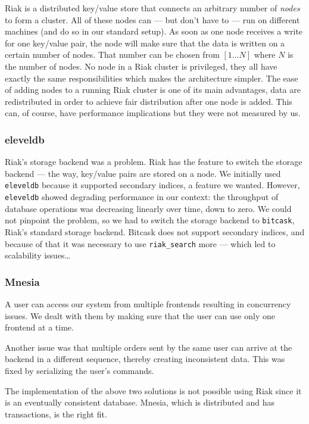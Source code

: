 \documentclass[11pt,a4paper]{report}
\begin{document}
Riak is a distributed key/value store that connects an arbitrary number of
{\em nodes} to form a cluster. All of these nodes can --- but don't have to ---
run on different machines (and do so in our standard setup). As soon as one
node receives a write for one key/value pair, the node will make sure that the
data is written on a certain number of nodes. That number can be chosen from
$[1 \ldots N]$ where $N$ is the number of nodes.
No node in a Riak cluster is privileged, they all have exactly the same
responsibilities which makes the architecture simpler.
The ease of adding nodes to a running Riak cluster is one of its main
advantages, data are redistributed in order to achieve fair distribution after
one node is added. This can, of course, have performance implications but they
were not measured by us.

\subsubsection{eleveldb}
Riak's storage backend was a problem. Riak has the feature to switch the
storage backend --- the way, key/value pairs are stored on a node.
We initially used {\tt eleveldb} because it supported secondary indices, a
feature we wanted. However, {\tt eleveldb} showed degrading performance
in our context: the throughput of database operations was decreasing linearly
over time, down to zero. We could not pinpoint the problem, so we had to switch
the storage backend to {\tt bitcask}, Riak's standard storage backend.
Bitcask does not support secondary indices, and because of that it was
necessary to use {\tt riak\_search} more --- which led to scalability
issues\ldots

\subsubsection{Mnesia}
\label{sec:mnesia}
A user can access our system from multiple frontends resulting in
concurrency issues. We dealt with them by making sure that the user
can use only one frontend at a time.

Another issue was that multiple orders sent by the same user can arrive at the
backend in a different sequence, thereby creating inconsistent data. This was
fixed by serializing the user's commands.

The implementation of the above two solutions is not possible using Riak since
it is an eventually consistent database. Mnesia, which is distributed and has
transactions, is the right fit.
\end{document}
